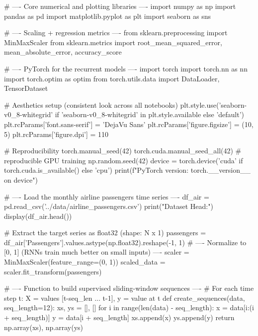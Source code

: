 
\begin{codebox}[title={Core numerical and plotting libraries}]
# ---- Core numerical and plotting libraries ----
import numpy as np
import pandas as pd
import matplotlib.pyplot as plt
import seaborn as sns

# ---- Scaling + regression metrics ----
from sklearn.preprocessing import MinMaxScaler
from sklearn.metrics import root_mean_squared_error, mean_absolute_error, accuracy_score

# ---- PyTorch for the recurrent models ----
import torch
import torch.nn as nn
import torch.optim as optim
from torch.utils.data import DataLoader, TensorDataset

# Aesthetics setup (consistent look across all notebooks)
plt.style.use('seaborn-v0_8-whitegrid' if 'seaborn-v0_8-whitegrid' in plt.style.available else 'default')
plt.rcParams['font.sans-serif'] = 'DejaVu Sans'
plt.rcParams['figure.figsize'] = (10, 5)
plt.rcParams['figure.dpi'] = 110

# Reproducibility
torch.manual_seed(42)
torch.cuda.manual_seed_all(42)  # reproducible GPU training
np.random.seed(42)
device = torch.device('cuda' if torch.cuda.is_available() else 'cpu')
print(f"PyTorch version: {torch.__version__} on {device}")

# ---- Load the monthly airline passengers time series ----
df_air = pd.read_csv('../data/airline_passengers.csv')
print("Dataset Head:")
display(df_air.head())

# Extract the target series as float32 (shape: N x 1)
passengers = df_air['Passengers'].values.astype(np.float32).reshape(-1, 1)
# ---- Normalize to [0, 1] (RNNs train much better on small inputs) ----
scaler = MinMaxScaler(feature_range=(0, 1))
scaled_data = scaler.fit_transform(passengers)

# ---- Function to build supervised sliding-window sequences ----
# For each time step t: X = values [t-seq_len ... t-1], y = value at t
def create_sequences(data, seq_length=12):
    xs, ys = [], []
    for i in range(len(data) - seq_length):
        x = data[i:(i + seq_length)]
        y = data[i + seq_length]
        xs.append(x)
        ys.append(y)
    return np.array(xs), np.array(ys)


\end{codebox}
